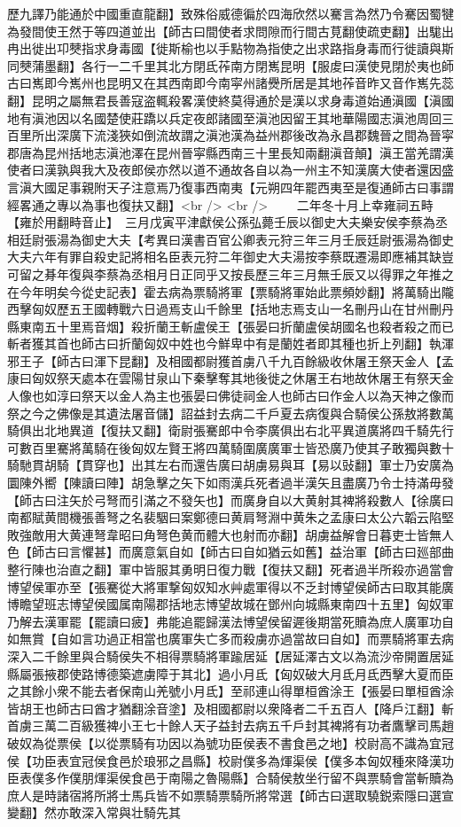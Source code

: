 歷九譯乃能通於中國重直龍翻】致殊俗威德徧於四海欣然以騫言為然乃令騫因蜀犍為發間使王然于等四道並出【師古曰間使者求問隙而行間古莧翻使疏吏翻】出駹出冉出徙出卭僰指求身毒國【徙斯榆也以手點物為指使之出求路指身毒而行徙讀與斯同僰蒲墨翻】各行一二千里其北方閉氐莋南方閉嶲昆明【服䖍曰漢使見閉於夷也師古曰嶲即今嶲州也昆明又在其西南即今南寜州諸㸑所居是其地莋音昨又音作嶲先蕊翻】昆明之屬無君長善寇盗輒殺畧漢使終莫得通於是漢以求身毒道始通滇國【滇國地有滇池因以名國楚使莊蹻以兵定夜郎諸國至滇池因留王其地華陽國志滇池周回三百里所出深廣下流淺狹如倒流故謂之滇池漢為益州郡後改為永昌郡魏晉之間為晉寜郡唐為昆州括地志滇池澤在昆州晉寜縣西南三十里長知兩翻滇音顛】滇王當羌謂漢使者曰漢孰與我大及夜郎侯亦然以道不通故各自以為一州主不知漢廣大使者還因盛言滇大國足事親附天子注意焉乃復事西南夷【元朔四年罷西夷至是復通師古曰事謂經畧通之專以為事也復扶又翻】<br />
<br />
　　二年冬十月上幸雍祠五畤【雍於用翻畤音止】　三月戊寅平津獻侯公孫弘薨壬辰以御史大夫樂安侯李蔡為丞相廷尉張湯為御史大夫【考異曰漢書百官公卿表元狩三年三月壬辰廷尉張湯為御史大夫六年有罪自殺史記將相名臣表元狩二年御史大夫湯按李蔡既遷湯即應補其缺豈可留之朞年復與李蔡為丞相月日正同乎又按長歷三年三月無壬辰又以得罪之年推之在今年明矣今從史記表】霍去病為票騎將軍【票騎將軍始此票頻妙翻】將萬騎出隴西擊匈奴歷五王國轉戰六日過焉支山千餘里【括地志焉支山一名刪丹山在甘州刪丹縣東南五十里焉音烟】殺折蘭王斬盧侯王【張晏曰折蘭盧侯胡國名也殺者殺之而已斬者獲其首也師古曰折蘭匈奴中姓也今鮮卑中有是蘭姓者即其種也折上列翻】執渾邪王子【師古曰渾下昆翻】及相國都尉獲首虜八千九百餘級收休屠王祭天金人【孟康曰匈奴祭天處本在雲陽甘泉山下秦擊奪其地後徙之休屠王右地故休屠王有祭天金人像也如淳曰祭天以金人為主也張晏曰佛徒祠金人也師古曰作金人以為天神之像而祭之今之佛像是其遺法屠音儲】詔益封去病二千戶夏去病復與合騎侯公孫敖將數萬騎俱出北地異道【復扶又翻】衛尉張騫郎中令李廣俱出右北平異道廣將四千騎先行可數百里騫將萬騎在後匈奴左賢王將四萬騎圍廣廣軍士皆恐廣乃使其子敢獨與數十騎馳貫胡騎【貫穿也】出其左右而還告廣曰胡虜易與耳【易以䜴翻】軍士乃安廣為圜陳外嚮【陳讀曰陣】胡急擊之矢下如雨漢兵死者過半漢矢且盡廣乃令士持滿毋發【師古曰注矢於弓弩而引滿之不發矢也】而廣身自以大黄射其裨將殺數人【徐廣曰南都賦黄間機張善弩之名裴駰曰案鄭德曰黄肩弩淵中黄朱之孟康曰太公六韜云陷堅敗強敵用大黄連弩韋昭曰角弩色黄而體大也射而亦翻】胡虜益解會日暮吏士皆無人色【師古曰言懼甚】而廣意氣自如【師古曰自如猶云如舊】益治軍【師古曰廵部曲整行陳也治直之翻】軍中皆服其勇明日復力戰【復扶又翻】死者過半所殺亦過當會博望侯軍亦至【張騫從大將軍撃匈奴知水艸處軍得以不乏封博望侯師古曰取其能廣博瞻望班志博望侯國属南陽郡括地志博望故城在鄧州向城縣東南四十五里】匈奴軍乃解去漢軍罷【罷讀曰疲】弗能追罷歸漢法博望侯留遲後期當死贖為庶人廣軍功自如無賞【自如言功過正相當也廣軍失亡多而殺虜亦過當故曰自如】而票騎將軍去病深入二千餘里與合騎侯失不相得票騎將軍踰居延【居延澤古文以為流沙帝開置居延縣屬張掖郡使路博德築遮虜障于其北】過小月氐【匈奴破大月氐月氐西擊大夏而臣之其餘小衆不能去者保南山羌號小月氐】至祁連山得單桓酋涂王【張晏曰單桓酋涂皆胡王也師古曰酋才猶翻涂音塗】及相國都尉以衆降者二千五百人【降戶江翻】斬首虜三萬二百級獲裨小王七十餘人天子益封去病五千戶封其裨將有功者鷹擊司馬趙破奴為從票侯【以從票騎有功因以為號功臣侯表不書食邑之地】校尉高不識為宜冠侯【功臣表宜冠侯食邑於琅邪之昌縣】校尉僕多為煇渠侯【僕多本匈奴種來降漢功臣表僕多作僕朋煇渠侯食邑于南陽之魯陽縣】合騎侯敖坐行留不與票騎會當斬贖為庶人是時諸宿將所將士馬兵皆不如票騎票騎所將常選【師古曰選取驍鋭索隱曰選宣變翻】然亦敢深入常與壮騎先其